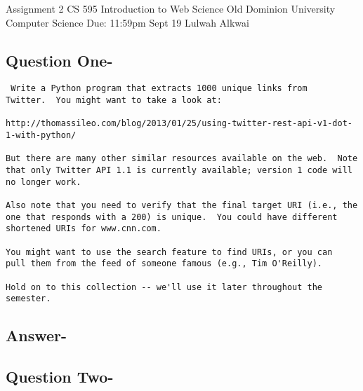 \documentclass[letterpaper,11pt]{article}
\begin{document}
\begin{titlepage}
\begin{center}

\Huge{Assignment 2}
\newline
\Large{CS 595}
\newline
\Large{Introduction to Web Science}
\newline
\Large{Old Dominion University}
\newline
\Large{Computer Science}
\newline
\Large{Due: 11:59pm Sept 19}
\newline
\Large{Lulwah Alkwai}
\newline
\end{center}
\end{titlepage}

\newpage


\subsection*{Question One-}

\begin{verbatim}
 Write a Python program that extracts 1000 unique links from
Twitter.  You might want to take a look at:

http://thomassileo.com/blog/2013/01/25/using-twitter-rest-api-v1-dot-1-with-python/

But there are many other similar resources available on the web.  Note
that only Twitter API 1.1 is currently available; version 1 code will
no longer work.

Also note that you need to verify that the final target URI (i.e., the
one that responds with a 200) is unique.  You could have different
shortened URIs for www.cnn.com.

You might want to use the search feature to find URIs, or you can
pull them from the feed of someone famous (e.g., Tim O'Reilly).

Hold on to this collection -- we'll use it later throughout the semester.
\end{verbatim}
\subsection*{Answer-}
\newpage



\subsection*{Question Two-}
\end{document}
